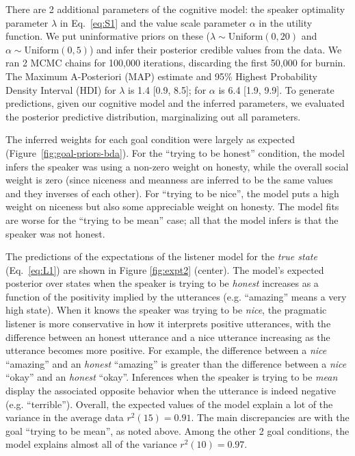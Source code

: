 \documentclass[10pt,letterpaper]{article}
\newcommand{\red}[1]{\textcolor{Red}{#1}}
\begin{document}
There are 2 additional parameters of the cognitive model: the speaker optimality parameter $\lambda$ in Eq.~\ref{eq:S1} and the value scale parameter $\alpha$ in the utility function.
We put uninformative priors on these ($\lambda \sim \text{Uniform}(0,20)$ and $\alpha \sim \text{Uniform}(0, 5)$) and infer their posterior credible values from the data.
We ran 2 MCMC chains for 100,000 iterations, discarding the first 50,000 for burnin.
The Maximum A-Posteriori (MAP) estimate and 95\% Highest Probability Density Interval (HDI) for $\lambda$ is 1.4 [0.9, 8.5]; for $\alpha$ is 6.4 [1.9, 9.9]. %
To generate predictions, given our cognitive model and the inferred parameters, we evaluated the posterior predictive distribution, marginalizing out all parameters.



The inferred weights for each goal condition were largely as expected (Figure~\ref{fig:goal-priors-bda}).
For the ``trying to be honest'' condition, the model infers the speaker was using a non-zero weight on honesty, while the overall social weight is zero (since niceness and meanness are inferred to be the same values and they inverses of each other).
For ``trying to be nice'', the model puts a high weight on niceness but also some appreciable weight on honesty.
The model fits are worse for the ``trying to be mean'' case; all that the model infers is that the speaker was not honest.

The predictions of the expectations of the listener model for the \emph{true state} (Eq.~\ref{eq:L1}) are shown in Figure \ref{fig:expt2} (center).
The model's expected posterior over states when the speaker is trying to be \emph{honest} increases as a function of the positivity implied by the utterances (e.g. ``amazing'' means a very high state).
When it knows the speaker was trying to be \emph{nice}, the pragmatic listener is more conservative in how it interprets positive utterances, with the difference between an honest utterance and a nice utterance increasing as the utterance becomes more positive. 
For example, the difference between a \emph{nice} ``amazing'' and an \emph{honest} ``amazing'' is greater than the difference between a \emph{nice} ``okay'' and an \emph{honest} ``okay''.
Inferences when the speaker is trying to be \emph{mean} display the associated opposite behavior when the utterance is indeed negative (e.g. ``terrible'').
Overall, the expected values of the model explain a lot of the variance in the average data $r^2(15) = 0.91$.
The main discrepancies are with the goal ``trying to be mean'', as noted above.
Among the other 2 goal conditions, the model explains almost all of the variance $r^2(10) = 0.97$.
\end{document}
